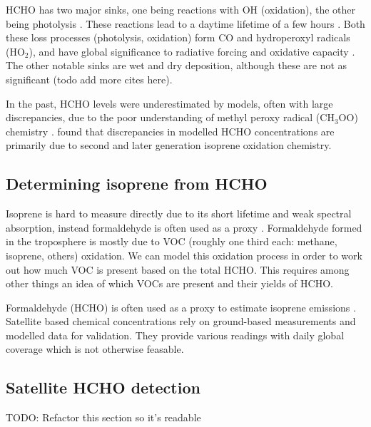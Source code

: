     HCHO has two major sinks, one being reactions with OH (oxidation), the other being photolysis \citep{Crutzen1999, Wagner2002, Levy1972, Kefauver2014}.
    These reactions lead to a daytime lifetime of a few hours \citep{Atkinson2000, Millet2006}.
    Both these loss processes (photolysis, oxidation) form CO and hydroperoxyl radicals (HO$_2$), and have global significance to radiative forcing and oxidative capacity \citep{Franco2015}.
    The other notable sinks are wet and dry deposition, although these are not as significant \citep{Atkinson2000} (todo add more cites here).
    
    In the past, HCHO levels were underestimated by models, often with large discrepancies, due to the poor understanding of methyl peroxy radical (CH$_3$OO) chemistry \citep{Wagner2002}.
    \cite{Marvin2017} found that discrepancies in modelled HCHO concentrations are primarily due to second and later generation isoprene oxidation chemistry.
    
  \subsection{Determining isoprene from HCHO}
    Isoprene is hard to measure directly due to its short lifetime and weak spectral absorption, instead formaldehyde is often used as a proxy \citep{Millet2006, Fu2007, Dufour2009, Marais2012, bauwens2013satellite, Kefauver2014, Bauwens2016}.
    Formaldehyde formed in the troposphere is mostly due to VOC (roughly one third each: methane, isoprene, others) oxidation.
    We can model this oxidation process in order to work out how much VOC is present based on the total HCHO.
    This requires among other things an idea of which VOCs are present and their yields of HCHO.
    
    Formaldehyde (HCHO) is often used as a proxy to estimate isoprene emissions \citep{Marais2012,bauwens2013satellite}.
    Satellite based chemical concentrations rely on ground-based measurements and modelled data for validation.
    They provide various readings with daily global coverage which is not otherwise feasable.
  
  \subsection{Satellite HCHO detection}
    TODO: Refactor this section so it's readable
    
